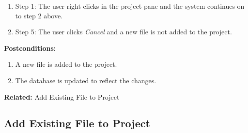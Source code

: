 \documentclass[14pt, a4paper]{article}
\begin{document}
\begin{framed}
\begin{enumerate}
		\item Step 1: The user right clicks in the project pane and the system continues on to step 2 above.
		\item Step 5: The user clicks \textit{Cancel} and a new file is not added to the project.
	\end{enumerate}
	\textbf{Postconditions:}
	\begin{enumerate}
		\item A new file is added to the project.
		\item The database is updated to reflect the changes.
	\end{enumerate}
	\textbf{Related:} Add Existing File to Project
\end{framed} 

\newpage

\subsection{Add Existing File to Project}
\end{document}
